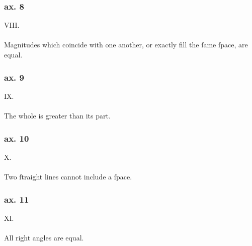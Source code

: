 \begin{minipage}{0.67\textwidth}
    \subsubsection{ax. 8}
    \begin{center}
        VIII.\label{ax8}\\
        \hfill\\
        Magnitudes which coincide with one another, or exactly fill the ſame ſpace, are equal.
    \end{center}
    \subsubsection{ax. 9}
    \begin{center}
        IX.\label{ax9}\\
        \hfill\\
        The whole is greater than its part.\\
    \end{center}
    \subsubsection{ax. 10}
    \begin{center}
        X.\label{ax10}\\
        \hfill\\
        Two ſtraight lines cannot include a ſpace.\\
    \end{center}
    \subsubsection{ax. 11}
    \begin{center}
        XI.\label{ax11}\\
        \hfill\\
        All right angles are equal.\\
    \end{center}
\end{minipage}%
\begin{minipage}{0.33\textwidth}
    \phantom{}
\end{minipage}

\hfill

